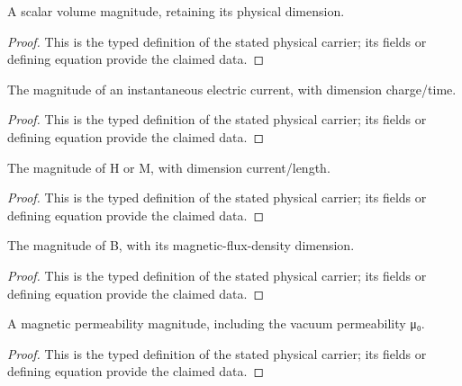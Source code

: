 \begin{definition}
  \label{def:physics:IPhO_2026_3_A_1:aux003}
  A scalar volume magnitude, retaining its physical dimension.
\end{definition}
\begin{proof}
  This is the typed definition of the stated physical carrier; its fields or defining equation provide the claimed data.
\end{proof}

\begin{definition}
  \label{def:physics:IPhO_2026_3_A_1:aux004}
  The magnitude of an instantaneous electric current, with dimension charge/time.
\end{definition}
\begin{proof}
  This is the typed definition of the stated physical carrier; its fields or defining equation provide the claimed data.
\end{proof}

\begin{definition}
  \label{def:physics:IPhO_2026_3_A_1:aux005}
  The magnitude of H or M, with dimension current/length.
\end{definition}
\begin{proof}
  This is the typed definition of the stated physical carrier; its fields or defining equation provide the claimed data.
\end{proof}

\begin{definition}
  \label{def:physics:IPhO_2026_3_A_1:aux006}
  The magnitude of B, with its magnetic-flux-density dimension.
\end{definition}
\begin{proof}
  This is the typed definition of the stated physical carrier; its fields or defining equation provide the claimed data.
\end{proof}

\begin{definition}
  \label{def:physics:IPhO_2026_3_A_1:aux007}
  A magnetic permeability magnitude, including the vacuum permeability μ₀.
\end{definition}
\begin{proof}
  This is the typed definition of the stated physical carrier; its fields or defining equation provide the claimed data.
\end{proof}

